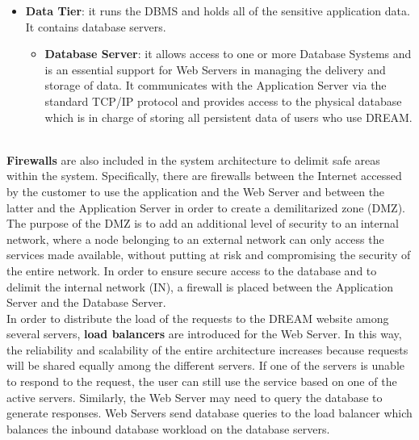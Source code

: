 \begin{itemize}
    \item \textbf{Data Tier}: it runs the DBMS and holds all of the sensitive application data. It contains database servers.
    \begin{itemize}
        \item \textbf{Database Server}: it allows access to one or more Database Systems and is an essential support for Web Servers in managing the delivery and storage of data. It communicates with the Application Server via the standard TCP/IP protocol and provides access to the physical database which is in charge of storing all persistent data of users who use DREAM.
    \end{itemize}
\end{itemize}\\


\textbf{Firewalls} are also included in the system architecture to delimit safe areas within the system. 
Specifically, there are firewalls between the Internet accessed by the customer to use the application and the Web Server and between the latter and the Application Server in order to create a demilitarized zone (DMZ). The purpose of the DMZ is to add an additional level of security to an internal network, where a node belonging to an external network can only access the services made available, without putting at risk and compromising the security of the entire network.
In order to ensure secure access to the database and to delimit the internal network (IN), a firewall is placed between the Application Server and the Database Server.\\


In order to distribute the load of the requests to the DREAM website among several servers, \textbf{load balancers} are introduced for the Web Server. In this way, the reliability and scalability of the entire architecture increases because requests will be shared equally among the different servers. If one of the servers is unable to respond to the request, the user can still use the service based on one of the active servers.
Similarly, the Web Server may need to query the database to generate responses. Web Servers send database queries to the load balancer which balances the inbound database workload on the database servers.



\def\fillandplacepagenumber{%
 \par\pagestyle{empty}%
\vbox to 0pt{\vss}\vfill
\vbox to 0pt{\baselineskip0pt
   \hbox to\linewidth{\hss}%
   \setlength{\footskip}{70pt}
   \baselineskip\footskip
   \hbox to\linewidth{%
     \hfil\thepage\hfil}\vss}}

